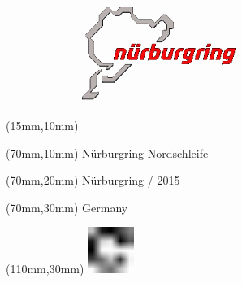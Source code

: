 \null\newpage
\begin{textblock*}{50mm}(15mm,10mm)%
\includegraphics[width=50mm]{LG/NUR.png}
\end{textblock*}
\begin{textblock*}{130mm}(70mm,10mm)%
{\fontsize{20}{20}\selectfont Nürburgring Nordschleife}\\
\end{textblock*}
\begin{textblock*}{120mm}(70mm,20mm)%
{\fontsize{16}{16}\selectfont Nürburgring / 2015}\\
\end{textblock*}
\begin{textblock*}{120mm}(70mm,30mm)%
{\fontsize{12}{12}\selectfont Germany}
\end{textblock*}
\begin{textblock*}{30mm}(110mm,30mm)%
\centering
\includegraphics[height=15mm]{icons/fa-rotate-right.pdf}
\end{textblock*}
